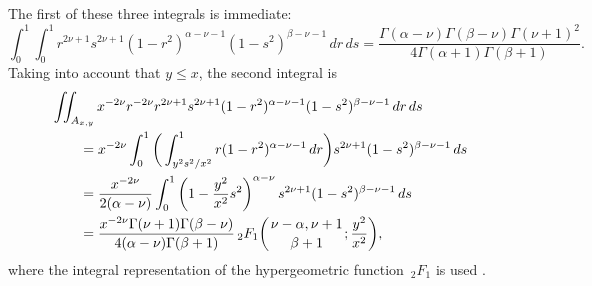 \documentclass[10pt,leqno,a4paper]{article}
\theoremstyle{plain}
\numberwithin{equation}{section}
\newcommand{\FF}[3]{{}_{2}F_{1}%
  \mathopen{}\left(\genfrac{}{}{0pt}{}{#1}{#2};#3\right)\mathclose{}}
\begin{document}
The first of these three integrals is immediate:
\[
   \int_0^1 \int_0^1 r^{2\nu+1} s^{2\nu+1} (1-r^2)^{\alpha-\nu-1} (1-s^2)^{\beta-\nu-1} \, dr \, ds
   = \frac{\Gamma(\alpha-\nu) \Gamma(\beta-\nu) \Gamma(\nu+1)^2}
   {4\Gamma(\alpha+1) \Gamma(\beta+1)}.
\]
Taking into account that $y \leq x$, the second integral is
\begin{align*}
   &\iint_{A_{x,y}} x^{-2\nu} r^{-2\nu} r^{2\nu+1} s^{2\nu+1} (1-r^2)^{\alpha-\nu-1}
   (1-s^2)^{\beta-\nu-1} \, dr \, ds
   \\
   &\qquad= x^{-2\nu} \int_0^1
   \bigg(\int_{y^2 s^2/x^2}^1 r(1-r^2)^{\alpha-\nu-1} \, dr\bigg)
   s^{2\nu+1} (1-s^2)^{\beta-\nu-1} \, ds
   \\
   &\qquad= \frac{x^{-2\nu}}{2(\alpha-\nu)}
   \int_0^1 \left(1-\frac{y^2}{x^2}s^2 \right)^{\alpha-\nu}
   s^{2\nu+1} (1-s^2)^{\beta-\nu-1} \, ds
   \\
   &\qquad= \frac{x^{-2\nu} \Gamma(\nu+1) \Gamma(\beta-\nu)}{4(\alpha-\nu)\Gamma(\beta+1)}
   \,\FF{\nu-\alpha, \nu+1}{\beta+1}{\frac{y^2}{x^2}},
\end{align*}
where the integral representation of the hypergeometric function~${}_{2}F_{1}$ is used
\cite[\href{https://dlmf.nist.gov/15.6.E1}{(15.6.1)}]{DLMF}.
\end{document}
